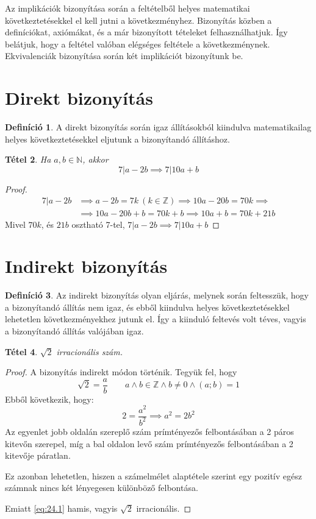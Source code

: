 \documentclass[twoside,12pt]{report}
\newtheorem{theorem}{Tétel}[section]
\theoremstyle{definition}
\newtheorem{definition}[theorem]{Definíció}
\begin{document}
	Az implikációk bizonyítása során a feltételből helyes matematikai következtetésekkel el kell jutni
	a következményhez. Bizonyítás közben a definíciókat, axiómákat, és a már bizonyított tételeket
	felhasználhatjuk. Így belátjuk, hogy a feltétel valóban elégséges feltétele a következménynek.
	Ekvivalenciák bizonyítása során két implikációt bizonyítunk be.
\section{Direkt bizonyítás}
	\begin{definition}
		A direkt bizonyítás során igaz állításokból kiindulva matematikailag helyes következtetésekkel eljutunk a bizonyítandó állításhoz.
	\end{definition}
	\begin{theorem}
		Ha $a,b\in\mathbb{N}$, akkor
		\begin{equation*}
			7|a-2b\implies 7|10a+b
		\end{equation*}
	\end{theorem}
	\begin{proof}
		\begin{align*}
			7|a-2b&\implies a-2b=7k\ (k\in\mathbb{Z})\implies 10a-20b=70k\implies\\
			&\implies 10a-20b+b=70k+b\implies 10a+b=70k+21b
		\end{align*}
		Mivel $70k$, és $21b$ osztható 7-tel, $7|a-2b\implies 7|10a+b$
	\end{proof}
\section{Indirekt bizonyítás}
	\begin{definition}
		Az indirekt bizonyítás olyan eljárás, melynek során feltesszük, hogy a bizonyítandó állítás nem igaz, és ebből kiindulva helyes következtetésekkel lehetetlen következményekhez jutunk el. Így a kiinduló feltevés volt téves, vagyis a bizonyítandó állítás valójában igaz.
	\end{definition}
	\begin{theorem}
		$\sqrt{2}$ irracionális szám.
	\end{theorem}
	\begin{proof}
		A bizonyítás indirekt módon történik. Tegyük fel, hogy 
		\begin{equation}\label{eq:24.1}
		\sqrt{2}=\frac{a}{b}\qquad a\wedge b\in\mathbb{Z}\wedge b\ne0\wedge(a;b)=1
		\end{equation}
		Ebből következik, hogy:
		\begin{equation}
		2=\frac{a^2}{b^2}\implies a^2=2b^2
		\end{equation}
		Az egyenlet jobb oldalán szereplő szám prímtényezős felbontásában a 2 páros kitevőn szerepel, míg a bal oldalon levő szám prímtényezős felbontásában a 2 kitevője páratlan.
		
		Ez azonban lehetetlen, hiszen a számelmélet alaptétele szerint egy pozitív egész számnak
		nincs két lényegesen különböző felbontása. 
		
		Emiatt \eqref{eq:24.1} hamis, vagyis $\sqrt{2}$ irracionális.
	\end{proof}
\end{document}
